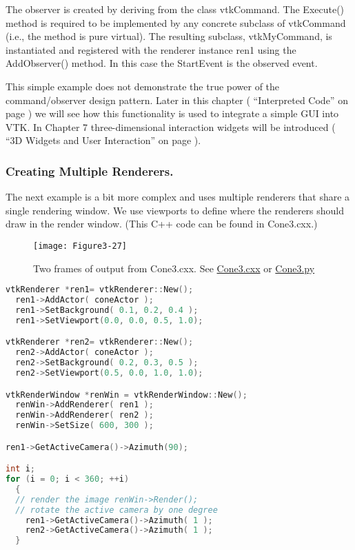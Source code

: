 The observer is created by deriving from the class vtkCommand. The Execute() method is required to be implemented by any concrete subclass of vtkCommand (i.e., the method is pure virtual). The resulting subclass, vtkMyCommand, is instantiated and registered with the renderer instance ren1 using the AddObserver() method. In this case the StartEvent is the observed event.

This simple example does not demonstrate the true power of the command/observer design pattern. Later in this chapter ( ``Interpreted Code'' on page \pageref{subsec:interpreted_code} ) we will see how this functionality is used to integrate a simple GUI into VTK. In Chapter 7 three-dimensional interaction widgets will be introduced ( ``\gls{3D Widget}s and User Interaction''  on page \pageref{sec:3D_widgets_user_interaction} ).

\subsubsection{Creating Multiple Renderers.}
The next example is a bit more complex and uses multiple renderers that share a single rendering window. We use viewports to define where the renderers should draw in the render window. (This C++ code can be found in Cone3.cxx.)

\begin{figure}[!htb]
  \centering
  \texttt{[image: Figure3-27]}\\
  \caption{Two frames of output from Cone3.cxx. See  \href{https://lorensen.github.io/VTKExamples/site/Cxx/Rendering/Cone3/}{Cone3.cxx} or \href{https://lorensen.github.io/VTKExamples/site/Python/Rendering/Cone3/}{Cone3.py}}\label{fig:Figure3-27}
\end{figure}

\begin{lstlisting}[language=C++, caption={Cone3.cxx}]
vtkRenderer *ren1= vtkRenderer::New();
  ren1->AddActor( coneActor );
  ren1->SetBackground( 0.1, 0.2, 0.4 );
  ren1->SetViewport(0.0, 0.0, 0.5, 1.0);

vtkRenderer *ren2= vtkRenderer::New();
  ren2->AddActor( coneActor );
  ren2->SetBackground( 0.2, 0.3, 0.5 );
  ren2->SetViewport(0.5, 0.0, 1.0, 1.0);

vtkRenderWindow *renWin = vtkRenderWindow::New();
  renWin->AddRenderer( ren1 );
  renWin->AddRenderer( ren2 );
  renWin->SetSize( 600, 300 );

ren1->GetActiveCamera()->Azimuth(90);

int i;
for (i = 0; i < 360; ++i)
  {
  // render the image renWin->Render();
  // rotate the active camera by one degree
    ren1->GetActiveCamera()->Azimuth( 1 );
    ren2->GetActiveCamera()->Azimuth( 1 );
  }
\end{lstlisting}

